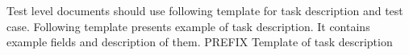 \begin{comment}
			\begin{table}
			\caption{Example task description (for one task)}
			\label{tab:example-task-description}
			\centering
			\begin{tabular}{@{}lp{0.7\linewidth}lp{}}
			\toprule
			\emph{Task} & Generate system test design \\
			\midrule
			\emph{Methods} & Ensure that test design correctly emanates from the system test plan and conforms
			to IEEE Std 829-2008 regarding purpose, format, and content.\\
			\emph{Inputs} & System Test Plan, IEEE Std 829-2008 \\
			\emph{Outputs} & System Test Design, provide input to Master Test Report \\
			\emph{Schedule} & Initiate (with all inputs received) 30 days after the start of the project. Must be
			completed and approved 120 days after start of project. \\
			\emph{Resources} & Refer to MTP clause 1.5.4. \\
			\emph{Risk(s) and assumptions} & Risk: adequacy and timeliness of the test plans
			Assumption: Timeliness is a primary concern because the team writing the test
			cases is dependent on the receipt of this the test plans \\
			\emph{Roles and responsibilities} & Refer to MTP clause 1.5.5. \\
			\bottomrule
			\end{tabular}
			\end{table}
			$>$
		\end{comment}
		Test level documents should use following template for task description and test case. Following template presents example of task description. It contains example fields and description of them.	
		\taskdescription
		{
			PREFIX
		}
		{
			Template of task description
		}
